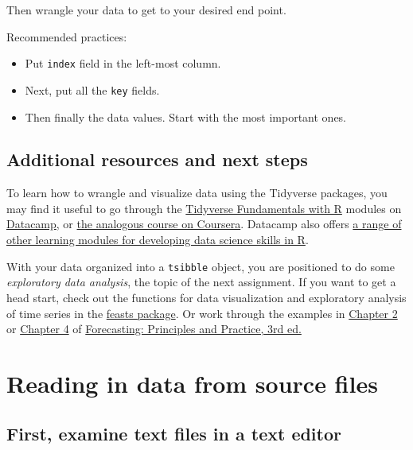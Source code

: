 \documentclass[
]{book}
\providecommand{\tightlist}{%
  \setlength{\itemsep}{0pt}\setlength{\parskip}{0pt}}
\begin{document}
Then wrangle your data to get to your desired end point.

Recommended practices:

\begin{itemize}
\tightlist
\item
  Put \texttt{index} field in the left-most column.
\item
  Next, put all the \texttt{key} fields.
\item
  Then finally the data values. Start with the most important ones.
\end{itemize}

\hypertarget{additional-resources-and-next-steps}{%
\section{Additional resources and next steps}\label{additional-resources-and-next-steps}}

To learn how to wrangle and visualize data using the Tidyverse packages, you may find it useful to go through the \href{https://learn.datacamp.com/skill-tracks/tidyverse-fundamentals}{Tidyverse Fundamentals with R} modules on \href{https://learn.datacamp.com/}{Datacamp}, or \href{https://www.coursera.org/specializations/tidyverse-data-science-r}{the analogous course on Coursera}. Datacamp also offers \href{https://learn.datacamp.com/career-tracks/data-scientist-with-r}{a range of other learning modules for developing data science skills in R}.

With your data organized into a \texttt{tsibble} object, you are positioned to do some \emph{exploratory data analysis}, the topic of the next assignment. If you want to get a head start, check out the functions for data visualization and exploratory analysis of time series in the \href{https://feasts.tidyverts.org/}{feasts package}. Or work through the examples in \href{https://otexts.com/fpp3/graphics.html}{Chapter 2} or \href{https://otexts.com/fpp3/features.html}{Chapter 4} of \href{https://otexts.com/fpp3/}{Forecasting: Principles and Practice, 3rd ed.}

\hypertarget{reading-in-data-from-source-files}{%
\chapter{Reading in data from source files}\label{reading-in-data-from-source-files}}

\hypertarget{first-examine-text-files-in-a-text-editor}{%
\section{First, examine text files in a text editor}\label{first-examine-text-files-in-a-text-editor}}
\end{document}
